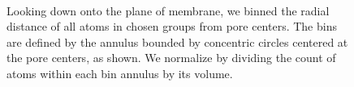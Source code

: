 \documentclass{article}
\begin{document}
\begin{figure}
\begin{minipage}{0.45\textwidth}
  \caption{
  Looking down onto the plane of membrane, 
  we binned the radial distance of all atoms in chosen groups from
  pore centers. The bins are defined by the annulus bounded by concentric
  circles centered at the pore centers, as shown. We normalize by
  dividing the count of atoms within each bin annulus by its volume.
  }~\label{fig:rdf_diagram}
  \end{minipage}
  \end{figure}
\end{document}
